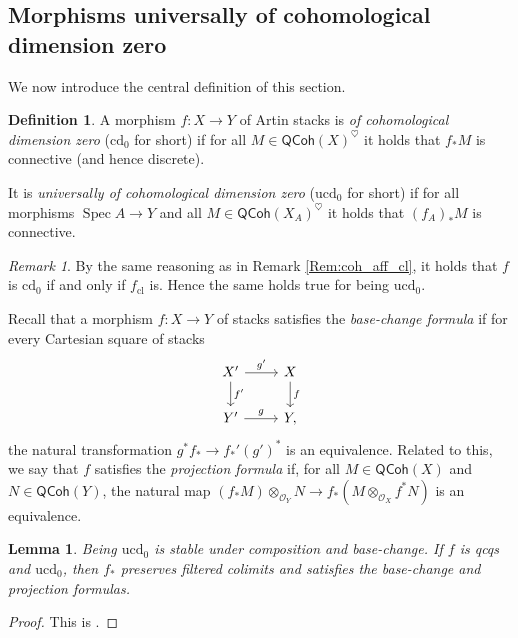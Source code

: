 \documentclass[a4paper,twoside,11pt]{amsart}
\theoremstyle{plain}
\newtheorem{lemma}[theorem]{Lemma}
\theoremstyle{definition}
\newtheorem{definition}[theorem]{Definition}
\theoremstyle{remark}
\newtheorem{remark}[theorem]{Remark}
\numberwithin{equation}{section}
\newcommand{\cd}{\mathrm{cd}}
\newcommand{\ucd}{$\mathrm{ucd}_{0}$\xspace}
\renewcommand{\cd}{$\mathrm{cd}_{0}$\xspace}
\DeclareMathOperator{\Spec}{Spec} %
\newcommand{\QCoh}{\mathsf{QCoh}}
\newcommand{\cl}{\mathrm{cl}} %
\newcommand{\oO}{\mathcal{O}}
\begin{document}
\subsection{Morphisms universally of cohomological dimension zero} We now introduce the central definition of this section.

\begin{definition}
    A morphism $f \colon X \to Y$ of Artin stacks is \emph{of cohomological dimension zero} (\cd for short) if for all $M \in \QCoh(X)^{\heartsuit}$ it holds that $f_\ast M$ is connective (and hence discrete).
    
    It is \emph{universally of cohomological dimension zero} (\ucd for short) if for all morphisms $\Spec A \to Y$ and all $M \in \QCoh(X_A)^{\heartsuit}$ it holds that $(f_A)_*M$ is connective.
\end{definition}

\begin{remark}
\label{Rem:coh_dim_cl}
    By the same reasoning as in Remark \ref{Rem:coh_aff_cl}, it holds that $f$ is \cd if and only if $f_\cl$ is. Hence the same holds true for being \ucd.
\end{remark}

Recall that a morphism $f \colon X \to Y$ of stacks  satisfies the \emph{base-change formula} if for every Cartesian square
of stacks
	\begin{equation}
		\label{E:base-change-square}
		\begin{tikzcd}
			X' \arrow[d, "f'"] \arrow[r, "g'"] & X \arrow[d, "f"] \\
			Y' \arrow[r, "g"] & Y, 
		\end{tikzcd}
	\end{equation}
 the natural transformation $g^*f_* \to f_*' (g')^*$ is an equivalence. Related to this, we say that $f$ satisfies the \emph{projection formula} if, for all $M \in \QCoh(X)$ and $N \in \QCoh(Y)$, the natural map $(f_*M) \otimes_{\oO_Y} N \to f_*(M\otimes_{\oO_X} f^*N)$ is an equivalence.

\begin{lemma}
\label{Lem:ucd0_props}
    Being \ucd is stable under composition and base-change. If $f$ is qcqs and \ucd, then $f_*$ preserves filtered colimits and satisfies the base-change and projection formulas.
\end{lemma}

\begin{proof}
    This is \cite[Prop.~A.1.5, Lem.~A.1.6]{HalpernleistnerMapping}.
\end{proof} 
\end{document}
